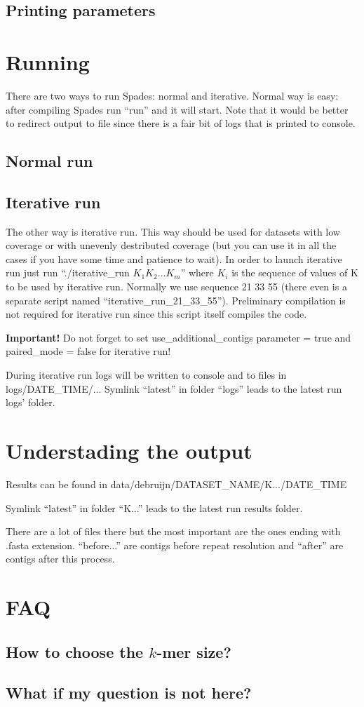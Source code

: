 \documentclass{article}
\begin{document}
\subsection{Printing parameters}


\section{Running}
There are two ways to run Spades: normal and iterative. Normal way is easy: after compiling Spades run ``run'' and it will start. 
Note that it would be better to redirect output to file since there is a fair bit of logs that is printed to console.

\subsection{Normal run}

\subsection{Iterative run}

The other way is iterative run.
This way should be used for datasets with low coverage or with unevenly destributed coverage 
(but you can use it in all the cases if you have some time and patience to wait). 
In order to launch iterative run just run ``./iterative\_run $K_1 K_2 \dots K_m$'' where $K_i$ is the sequence of values of K to be used by iterative run.
Normally we use sequence 21 33 55 (there even is a separate script named ``iterative\_run\_21\_33\_55'').
Preliminary compilation is not required for iterative run since this script itself compiles the code.

\textbf{Important!} Do not forget to set use\_additional\_contigs parameter = true and paired\_mode = false for iterative run!

During iterative run logs will be written to console and to files in logs/DATE\_TIME/...
Symlink ``latest'' in folder ``logs'' leads to the latest run logs' folder.


\section{Understading the output}

Results can be found in data/debruijn/DATASET\_NAME/K.../DATE\_TIME

Symlink ``latest'' in folder ``K...'' leads to the latest run results folder.

There are a lot of files there but the most important are the ones ending with .fasta extension. ``before...'' are contigs before repeat
resolution and ``after'' are contigs after this process.

\section{FAQ}
\subsection{How to choose the $k$-mer size?}
\subsection{What if my question is not here?}
\end{document}
